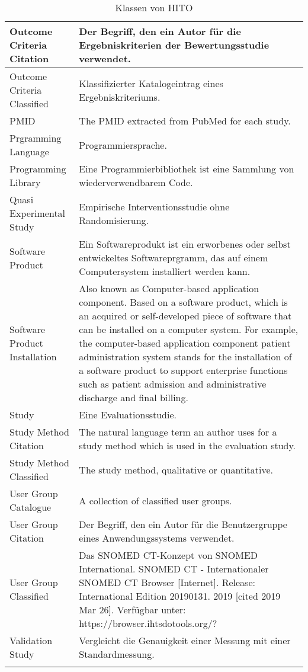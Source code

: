 \begin{longtable}{ | p{4 cm} | p{7 cm} | }
\hline
Outcome Criteria Citation & Der Begriff, den ein Autor für die Ergebniskriterien der Bewertungsstudie verwendet. \\
\hline
Outcome Criteria Classified & Klassifizierter Katalogeintrag eines Ergebniskriteriums. \\
\hline
PMID & The PMID extracted from PubMed for each study. \\
\hline
Prgramming Language & Programmiersprache. \\ 
\hline
Programming Library & Eine Programmierbibliothek ist eine Sammlung von wiederverwendbarem Code. \\
\hline
Quasi Experimental Study & Empirische Interventionsstudie ohne Randomisierung. \\
\hline
Software Product & Ein Softwareprodukt ist ein erworbenes oder selbst entwickeltes Softwareprgramm, das auf einem Computersystem installiert werden kann. \\
\hline
Software Product Installation & Also known as Computer-based application component. Based on a software product, which is an acquired or self-developed piece of software that can be installed on a computer system. For example, the computer-based application component patient administration system stands for the installation of a software product to support enterprise functions such as patient admission and administrative discharge and final billing. \\
\hline
Study & Eine Evaluationsstudie. \\
\hline
Study Method Citation & The natural language term an author uses for a study method which is used in the evaluation study. \\
\hline
Study Method Classified & The study method, qualitative or quantitative. \\
\hline
User Group Catalogue & A collection of classified user groups. \\
\hline
User Group Citation & Der Begriff, den ein Autor für die Benutzergruppe eines Anwendungssystems verwendet. \\
\hline
User Group Classified & Das SNOMED CT-Konzept von SNOMED International. SNOMED CT - Internationaler SNOMED CT Browser [Internet]. Release: International Edition 20190131. 2019 [cited 2019 Mar 26]. Verfügbar unter: https://browser.ihtsdotools.org/? \\
\hline
Validation Study & Vergleicht die Genauigkeit einer Messung mit einer Standardmessung.\\
\hline
\caption{Klassen von HITO}
\end{longtable}


